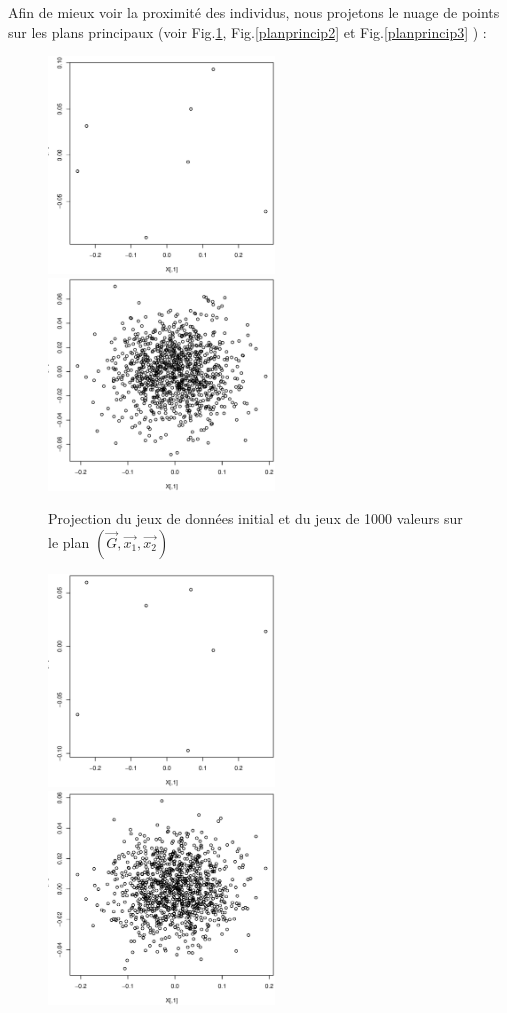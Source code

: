 \documentclass[a4paper]{article}
\begin{document}
\begin{appendices}
Afin de mieux voir la proximité des individus, nous projetons le nuage de points sur les plans principaux (voir Fig.\ref{planprincip1}, Fig.\ref{planprincip2} et    Fig.\ref{planprincip3}    )      :
\begin{figure}[H]
\includegraphics[width=6cm]{projdataex12.eps}\hfill
\includegraphics[width=6cm]{projgenerex12.eps}
\caption{Projection du jeux de données initial et du jeux de 1000 valeurs sur le plan $(\vec{G},\vec{x_{1}},\vec{x_{2}})$}
 \label{planprincip1}  
\end{figure}
\begin{figure}[H]
\includegraphics[width=6cm]{projgenerex13.eps}\hfill
\includegraphics[width=6cm]{projdataex13.eps}

\end{figure}
\end{appendices}
\end{document}
